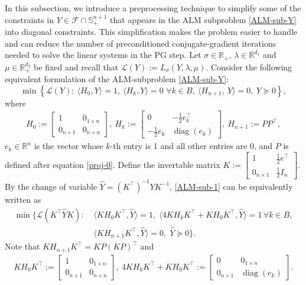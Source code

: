 \documentclass[11pt]{article}
\theoremstyle{plain}
\def\L{\mathcal{L}}
\def\F{\mathcal{F}}
\def\R{\mathbb{R}}
\def\S{\mathbb{S}}
\begin{document}
In this subsection, we introduce a preprocessing technique to simplify some of the constraints in $Y\in\F\cap\S^{n+1}_+$ that appears in the ALM subproblem \eqref{ALM-sub-Y} into diagonal constraints. This simplification makes the problem easier to handle and can reduce the number of preconditioned conjugate-gradient iterations needed to solve the 
linear systems in the PG step. Let $\sigma\in\R_+$, $\lambda\in \R^{d_1}$ and $\mu\in \R^{d_2}_+$ be fixed and recall that $\L(Y):=L_{\sigma}(Y,\lambda,\mu)$. Consider the following equivalent formulation of the ALM-subproblem \eqref{ALM-sub-Y}:
\begin{equation}\label{ALM-sub-1}
\min \left\{ \L(Y) :\ \langle H_0, Y  \rangle = 1,\ \langle H_k, Y  \rangle = 0 \,\, \forall k \in B,\ \langle H_{n+1},\ Y \rangle = 0,\ Y\succeq 0\right\},
\end{equation}
where 
\begin{align*}
H_0 := \begin{bmatrix} 1 & 0_{1 \times n} \\ 0_{n \times 1} & 0_{n \times n} \end{bmatrix},\ 
H_k := \begin{bmatrix} 0 & -\frac{1}{2} e_k^{\top} \\ -\frac{1}{2} e_k & \operatorname{diag}(e_k) \end{bmatrix},\
H_{n+1}:=PP^\top,
\end{align*}
$e_k \in \mathbb{R}^n$ is the vector whose $k$-th entry is 1 and all other entries are 0, and $P$ is defined after equation \eqref{proj-0}. 
Define the invertable matrix $K:=\begin{bmatrix} 1 & \frac{1}{2}e^\top \\ 0_{n \times 1} & \frac{1}{2}I_n\end{bmatrix}$. By the change of variable $\widehat{Y}=(K^\top)^{-1}YK^{-1}$, \eqref{ALM-sub-1} can be equivalently written as
\begin{equation}\label{ALM-sub-2}
\begin{aligned}
    \min \Big\{ \L(K^\top \widehat{Y}K) :  \; &\langle KH_0K^\top,  \widehat{Y}  \rangle = 1, \; \langle 4KH_kK^\top+KH_0K^\top, \widehat{Y}  \rangle = 1 \, \forall k \in B, \\
    & \langle KH_{n+1}K^\top,  \widehat{Y} \rangle = 0, \; \widehat{Y} \succeq 0 \Big\}.
\end{aligned}
\end{equation}
Note that $KH_{n+1}K^\top=KP(KP)^\top$ and
\begin{align*}
KH_0K^\top := \begin{bmatrix} 1 & 0_{1 \times n} \\ 0_{n \times 1} & 0_{n \times n} \end{bmatrix},\
4KH_kK^\top+KH_0K^\top := \begin{bmatrix} 0 & 0_{1 \times n} \\ 0_{n \times 1}& \operatorname{diag}(e_k) \end{bmatrix}.
\end{align*}
\end{document}
